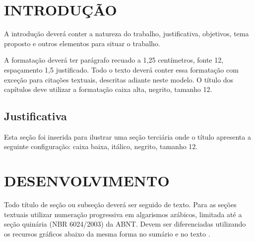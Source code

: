 
\chapter{\uppercase{Introdução}}

A introdução deverá conter a natureza do trabalho, justificativa, objetivos, tema proposto e outros elementos para situar o trabalho.

A formatação deverá ter parágrafo recuado a 1,25 centímetros, fonte 12, espaçamento 1,5 justificado. Todo o texto deverá conter essa formatação com exceção para citações textuais, 
descritas adiante neste modelo. O título dos capítulos deve utilizar a formatação caixa alta, negrito, tamanho 12.

\section{\hspace{-0.3cm}Justificativa} %

Esta seção foi inserida para ilustrar uma seção terciária onde o título apresenta a seguinte configuração: caixa baixa, itálico, negrito, tamanho 12.

\chapter{\uppercase{Desenvolvimento}}

Todo título de seção ou subseção deverá ser seguido de texto.
Para as seções textuais utilizar numeração progressiva em algarismos arábicos, limitada até a seção quinária 
(NBR 6024/2003) da ABNT.
 Devem ser diferenciadas utilizando os recursos gráficos abaixo da mesma forma no sumário e no texto \cite{manualpuc}.

